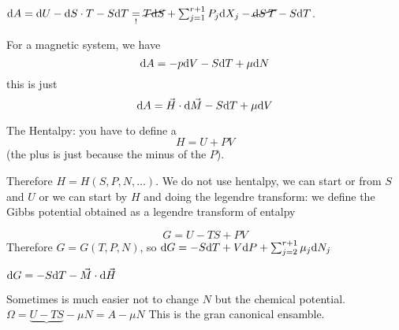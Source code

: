 \documentclass[../main/main.tex]{subfiles}
\begin{document}
$\mathrm{d} A = \mathrm{d} U - \mathrm{d} S \cdot T - S \mathrm{d} T  \underset{!}{=} \cancel{T \mathrm{d} S} + \sum_{j=1}^{r+1} P_j \mathrm{d} X_j - \cancel{\mathrm{d} S \, T } - S \mathrm{d} T $.  

For a magnetic system, we have 
$$ \mathrm{d} A = - p \mathrm{d} V - S \mathrm{d} T + \mu \mathrm{d} N $$
this is just
$$ \mathrm{d} A = \vec{H} \cdot \mathrm{d} \vec{M} - S \mathrm{d} T + \mu \mathrm{d} V $$

The Hentalpy:
you have to define a
$$ H = U + P V $$ (the plus is just because the minus of the $P$). 

Therefore $H = H ( S, P, N , \dots ) $.
We do not use hentalpy, we can start or from $S$ and $U$ or we can start by $H$ and doing the legendre transform: we define the Gibbs potential obtained as a legendre transform of entalpy

$$ G = U - T S + P V $$ 
Therefore $ G = G ( T, P, N ) $, so $\mathrm{d} G = - S \mathrm{d} T + V \mathrm{d} P + \sum_{j=2}^{r+1} \mu_j \mathrm{d} N_j $

$ \mathrm{d} G = - S \mathrm{d} T - \vec{M} \cdot \mathrm{d} \vec{H} $

Sometimes is much easier not to change $N$ but the chemical potential.
$\Omega = \underbrace{U - T S} - \mu N = A - \mu N $ 
This is the gran canonical ensamble. 
\end{document}
